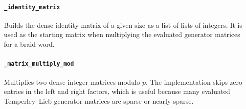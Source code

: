 \documentclass[10pt]{article}
\begin{document}
\paragraph{\texttt{\_identity\_matrix}}
Builds the dense identity matrix of a given size as a list of lists of integers.
It is used as the starting matrix when multiplying the evaluated generator matrices for a braid word.

\paragraph{\texttt{\_matrix\_multiply\_mod}}
Multiplies two dense integer matrices modulo \(p\).
The implementation skips zero entries in the left and right factors, which is useful because many evaluated Temperley--Lieb generator matrices are sparse or nearly sparse.
\end{document}
